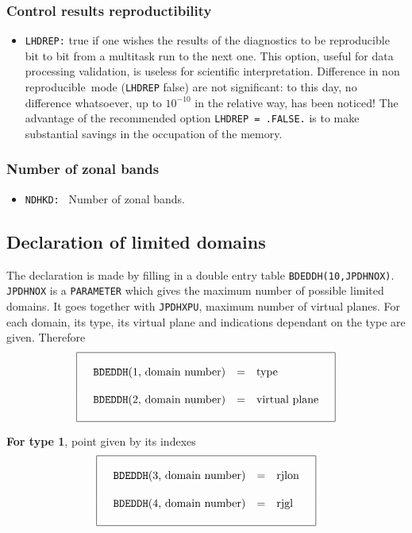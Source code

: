 \subsubsection{Control results reproductibility}
\begin{itemize}
\item {\tt LHDREP:} true if one wishes the results of the diagnostics to be
reproducible bit to bit from a multitask run to the next one. This option,
useful for data processing validation, is useless for scientific interpretation.
Difference in \og non reproducible\fg\ mode ({\tt LHDREP} false) are not
significant: to this day, no difference whatsoever, up to $10^{-10}$ in
the relative way, has been noticed! The advantage of the recommended option
{\tt LHDREP = .FALSE.} is to make substantial savings in the occupation of the
memory.
\end{itemize}
\subsubsection{Number of zonal bands}
\begin{itemize}
\item {\tt NDHKD: } Number of zonal bands.
\end{itemize}
\subsection{Declaration of limited domains}

The declaration is made by filling in a double entry table {\tt BDEDDH(10,JPDHNOX)}.
{\tt JPDHNOX} is a {\tt PARAMETER} which gives the maximum number of possible
limited domains. It goes together with {\tt JPDHXPU}, maximum
number of virtual planes.
For each domain, its type, its virtual plane and indications dependant on the type are given. Therefore
$$ \bay{|rcl|} \hline & & \\
\quad \hbox{{\tt BDEDDH}(1, domain number)} &=& \hbox{type} \quad \\[3ex]
\quad \hbox{{\tt BDEDDH}(2, domain number)} &=& \hbox{virtual plane} \quad \\[3ex]
\hline \eay $$

{\bf For type 1}, point given by its indexes
$$ \bay{|rcl|} \hline & & \\
\quad \hbox{{\tt BDEDDH}(3, domain number)} &=& \hbox{rjlon} \quad \\[3ex]
\quad \hbox{{\tt BDEDDH}(4, domain number)} &=& \hbox{rjgl} \quad \\[3ex]
\hline \eay $$

